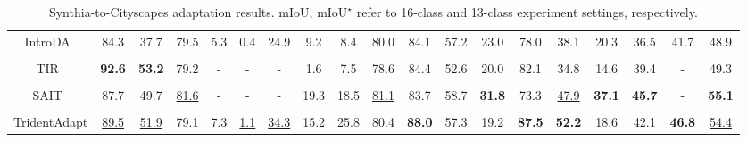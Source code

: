 \documentclass{bmvc2k}
\begin{document}
\begin{table}[htb!]
\begin{tabular}{c|cccccccccccccccc|cc}
    IntroDA~\cite{pan2020unsupervised} &  84.3& 37.7& 79.5& 5.3& 0.4& 24.9& 9.2& 8.4& 80.0& 84.1& 57.2& 23.0&  78.0&  38.1& 20.3& 36.5& 41.7& 48.9\\
    \\[-1.5em]
    TIR~\cite{kim2020learning} &  {\bf92.6}&  {\bf53.2}& 79.2&-&-&-& 1.6& 7.5& 78.6& 84.4& 52.6& 20.0& 82.1& 34.8& 14.6&  39.4&  -& 49.3 \\
    \\[-1.5em]
    SAIT~\cite{musto2020semantically} &  87.7&  49.7&\underline{81.6}&-& -& -& 19.3& 18.5& \underline{81.1}& 83.7& 58.7& {\bf31.8}&  73.3&  \underline{47.9}& {\bf37.1}& {\bf45.7}& -& {\bf55.1}\\
\hline
   \\[-1.5em]
    TridentAdapt & \underline{89.5}&  \underline{51.9}& 79.1& 7.3& \underline{1.1}& \underline{34.3}& 15.2& 25.8&  80.4& {\bf88.0}& 57.3&  19.2&  {\bf87.5}& {\bf52.2}&18.6 & 42.1&{\bf46.8}&\underline{54.4} \\\hline
\end{tabular}
\caption{Synthia-to-Cityscapes adaptation results. mIoU, ${\textrm{mIoU}^\star}$ refer to {16}-class and {13}-class experiment settings, respectively.}
\label{tab:synthiatocity}
\vspace{-3.5mm}
\end{table}
\end{document}
